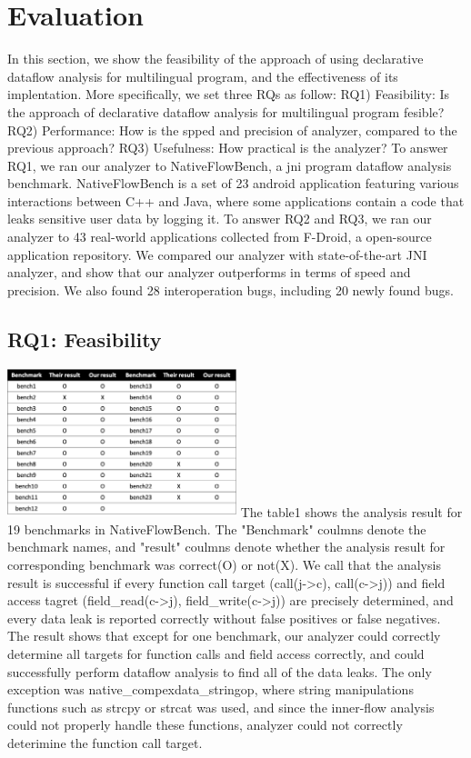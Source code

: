 \section{Evaluation}
In this section, we show the feasibility of the approach of using declarative
dataflow analysis for multilingual program, and the effectiveness of its
implentation. More specifically, we set three RQs as follow: RQ1) Feasibility:
Is the approach of declarative dataflow analysis for multilingual program
fesible?  RQ2) Performance: How is the spped and precision of analyzer,
compared to the previous approach?  RQ3) Usefulness: How practical is the
analyzer?  To answer RQ1, we ran our analyzer to NativeFlowBench, a jni program
dataflow analysis benchmark.  NativeFlowBench is a set of 23 android
application featuring various interactions between C++ and Java, where some
applications contain a code that leaks sensitive user data by logging it.  To
answer RQ2 and RQ3, we ran our analyzer to 43 real-world applications collected
from F-Droid, a open-source application repository. We compared our analyzer
with state-of-the-art JNI analyzer, and show that our analyzer outperforms in
terms of speed and precision. We also found 28 interoperation bugs, including
20 newly found bugs.


\subsection{RQ1: Feasibility}
\includegraphics[width=0.5\textwidth]{img/table1}
The table1 shows the analysis result for 19 benchmarks in NativeFlowBench.  The
"Benchmark" coulmns denote the benchmark names, and "result" coulmns denote
whether the analysis result for corresponding benchmark was correct(O) or
not(X). We call that the analysis result is successful if every function call
target (call(j->c), call(c->j)) and field access tagret (field\_read(c->j),
field\_write(c->j)) are precisely determined, and every data leak is reported
correctly without false positives or false negatives.  The result shows that
except for one benchmark, our analyzer could correctly determine all targets
for function calls and field access correctly, and could successfully perform
dataflow analysis to find all of the data leaks. The only exception was
native\_compexdata\_stringop, where string manipulations functions such as
strcpy or strcat was used, and since the inner-flow analysis could not
properly handle these functions, analyzer could not correctly deterimine the
function call target.

